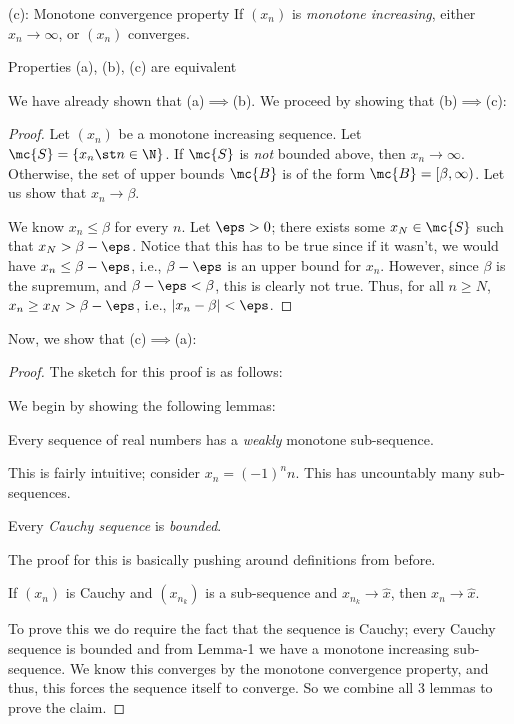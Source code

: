 \begin{nproperty}{ (c): Monotone convergence property}
	If \((x_n)\) is \emph{monotone increasing}, either \(x_n\to\infty\), or \((x_n)\) converges.
\end{nproperty}
\begin{ntheorem}{}
	Properties (a), (b), (c) are equivalent
\end{ntheorem}
We have already shown that (a)\(\implies\)(b). We proceed by showing that (b)\(\implies\)(c):
\begin{proof}
	Let \((x_n)\) be a monotone increasing sequence. Let \(\mc{S}=\{x_n\st n\in\N\}\). If \(\mc{S}\) is \emph{not} bounded above, then \(x_n\to\infty\). Otherwise, the set of upper bounds \(\mc{B}\) is of the form \(\mc{B}=[\beta,\infty)\). Let us show that \(x_n\to\beta\).
	
	\medskip
	
	We know \(x_n\leq\beta\) for every \(n\). Let \(\eps>0\); there exists some \(x_N\in\mc{S}\) such that \(x_N>\beta-\eps\). Notice that this has to be true since if it wasn't, we would have \(x_n\leq \beta-\eps\), i.e., \(\beta-\eps\) is an upper bound for \(x_n\). However, since \(\beta\) is the supremum, and \(\beta-\eps<\beta\), this is clearly not true. Thus, for all \(n\geq N\), \(x_n\geq x_N>\beta-\eps\), i.e., \(|x_n-\beta|<\eps\).
\end{proof}
Now, we show that (c)\(\implies\)(a):
\begin{proof}
	The sketch for this proof is as follows:
	
	\medskip
	
	We begin by showing the following lemmas:
	\begin{nlemma}{-1}
		Every sequence of real numbers has a \emph{weakly} monotone sub-sequence.
	\end{nlemma}
	This is fairly intuitive; consider \(x_n=(-1)^n n\). This has uncountably many sub-sequences.
	\begin{nlemma}{-2}
		Every \emph{Cauchy sequence} is \emph{bounded}.
	\end{nlemma}
	The proof for this is basically pushing around definitions from before.
	\begin{nlemma}{-3}
		If \((x_n)\) is Cauchy and \((x_{n_k})\) is a sub-sequence and \(x_{n_k}\to\hat{x}\), then \(x_n\to\hat{x}\).
	\end{nlemma}
	To prove this we do require the fact that the sequence is Cauchy; every Cauchy sequence is bounded and from Lemma-1 we have a monotone increasing sub-sequence. We know this converges by the monotone convergence property, and thus, this forces the sequence itself to converge. So we combine all 3 lemmas to prove the claim.
\end{proof}